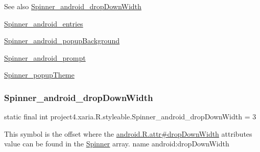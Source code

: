 \begin{DoxySeeAlso}{See also}
\hyperlink{classproject4_1_1xaria_1_1R_1_1styleable_aac6855533bf73e07082f2ba0fc69d86c}{Spinner\+\_\+android\+\_\+drop\+Down\+Width} 

\hyperlink{classproject4_1_1xaria_1_1R_1_1styleable_a15c697b1d47da63eeab7328fb0485ef3}{Spinner\+\_\+android\+\_\+entries} 

\hyperlink{classproject4_1_1xaria_1_1R_1_1styleable_ac3a672ea36ed3127190795a3296ee33c}{Spinner\+\_\+android\+\_\+popup\+Background} 

\hyperlink{classproject4_1_1xaria_1_1R_1_1styleable_a6a2f614c9012639c7b74d674247c4ef8}{Spinner\+\_\+android\+\_\+prompt} 

\hyperlink{classproject4_1_1xaria_1_1R_1_1styleable_a1172c7cabccd79ed9194907191930ce8}{Spinner\+\_\+popup\+Theme} 
\end{DoxySeeAlso}
\mbox{\label{classproject4_1_1xaria_1_1R_1_1styleable_aac6855533bf73e07082f2ba0fc69d86c}} 
\subsubsection{\texorpdfstring{Spinner\+\_\+android\+\_\+drop\+Down\+Width}{Spinner\_android\_dropDownWidth}}
{\footnotesize\ttfamily static final int project4.\+xaria.\+R.\+styleable.\+Spinner\+\_\+android\+\_\+drop\+Down\+Width = 3\hspace{0.3cm}{\ttfamily [static]}}

This symbol is the offset where the \hyperlink{}{android.\+R.\+attr\#drop\+Down\+Width} attribute\textquotesingle{}s value can be found in the \hyperlink{classproject4_1_1xaria_1_1R_1_1styleable_ad3bf2b8838fd43ac4b50c5c40afa1039}{Spinner} array.  name android\+:drop\+Down\+Width \mbox{\label{classproject4_1_1xaria_1_1R_1_1styleable_a15c697b1d47da63eeab7328fb0485ef3}} 
